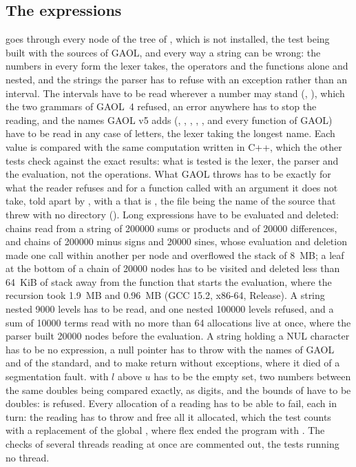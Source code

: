 \subsection{The expressions}

 goes through every node of the tree of
, which is not installed, the test being
built with the sources of GAOL,\newinvfive{} and every way a string can be wrong:
the numbers in every form the lexer takes, the operators and the functions
alone and nested, and the strings the parser has to refuse with an exception
rather than an interval. The intervals have to be read wherever a number may
stand (, \code{[cos([0,1]), 2]}), which the two grammars of
GAOL~4 refused, an error anywhere has to stop the reading, and the names
GAOL v5 adds (, , , ,
, and every function of GAOL) have to be read in any case of
letters, the lexer taking the longest name.\newinvfive{} Each value is
compared with the same computation written in C++, which the other tests
check against the exact results: what is tested is the lexer, the parser
and the evaluation, not the operations. What GAOL throws has to be exactly
 for what the reader refuses and
 for a function called with an argument it does
not take, told apart by , with a  that is
, the file being the name of the source that
threw with no directory ().\newinvfive{} Long
expressions have to be evaluated and deleted: chains read from a string of
200000 sums or products and of 20000 differences, and chains of 200000
minus signs and 20000 sines, whose evaluation and deletion made one call
within another per node and overflowed the stack of 8~MB; a leaf at the
bottom of a chain of 20000 nodes has to be visited and deleted less than
64~KiB of stack away from the function that starts the evaluation, where the
recursion took 1.9~MB and 0.96~MB (GCC 15.2, x86-64, Release). A string
nested 9000 levels has to be read, and one nested 100000 levels refused, and
a sum of 10000 terms read with no more than 64 allocations live at once,
where the parser built 20000 nodes before the evaluation.\newinvfive{} A
string holding a NUL character has to be no expression, a null pointer has
to throw  with the names of GAOL and of the
standard, and to make  return  without
exceptions, where it died of a segmentation fault. \code{[l, u]} with $l$
above $u$ has to be the empty set, two numbers between the same doubles
being compared exactly, as digits, and the bounds of  have to
be doubles:  is refused.\newinvfive{}
Every allocation of a reading has to be able to fail, each in turn: the
reading has to throw  and free all it allocated,
which the test counts with a replacement of the global ,
where flex ended the program with . The checks of several
threads reading at once are commented out, the tests running no thread.

